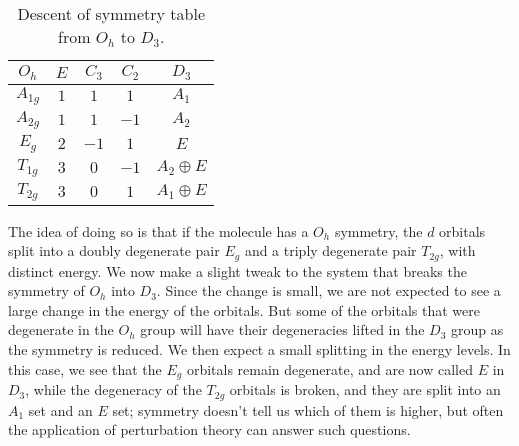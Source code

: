 \documentclass{article}
\theoremstyle{plain}\theoremheaderfont{\normalfont\itshape}\theorembodyfont{\rmfamily}\theoremseparator{.}\newtheorem*{rem}{Remark}\newtheorem*{ex}{Example}\newtheorem*{proof}{Proof}\newtheorem*{altp}{Alternative proof}
\theoremstyle{plain}\theoremheaderfont{\normalfont\bfseries}\theorembodyfont{\rmfamily}\theoremseparator{.}\newtheorem{thm}{Theorem}[section]\newtheorem{lem}[thm]{Lemma}\newtheorem{prop}[thm]{Proposition}\newtheorem*{cor}{Corollary}\newtheorem{defn}[thm]{Definition}\newtheorem{clm}[thm]{Claim}\newtheorem{clminproof}{Claim}\newtheorem*{law}{Law}\newtheorem{pos}[thm]{Postulate}
\theoremstyle{break}\theoremheaderfont{\normalfont\itshape}\theorembodyfont{\rmfamily}\theoremseparator{.\medskip}\newtheorem*{proofskip}{Proof}\newtheorem*{exs}{Examples}\newtheorem*{rems}{Remarks}
\theoremstyle{break}\theoremheaderfont{\normalfont\bfseries}\theorembodyfont{\rmfamily}\theoremseparator{.\medskip}\newtheorem{lemskip}[thm]{Lemma}\newtheorem{defnskip}[thm]{Definition}\newtheorem{propskip}[thm]{Proposition}\newtheorem{thmskip}[thm]{Theorem}
\numberwithin{equation}{section}
\begin{document}
    \begin{table}[ht!]
        \centering
        \begin{tabular}{c|ccc|c}
            \hline
            \(O_h\) & \(E\) & \(C_3\) & \(C_2\) & \(D_3\) \\ \hline
            \(A_{1g}\) & \(1\) & \(1\) & \(1\) &  \(A_1\) \\
            \(A_{2g}\) & \(1\) & \(1\) & \(-1\) &  \(A_2\) \\
            \(E_{g}\) & \(2\) & \(-1\) & \(1\) &  \(E\) \\
            \(T_{1g}\) & \(3\) & \(0\) & \(-1\) &  \(A_2\oplus E\) \\
            \(T_{2g}\) & \(3\) & \(0\) & \(1\) &  \(A_1\oplus E\) \\ \hline
        \end{tabular}
        \caption{Descent of symmetry table from \(O_h\) to \(D_3\).}
    \end{table}

    The idea of doing so is that if the molecule has a \(O_h\) symmetry, the \(d\) orbitals split into a doubly degenerate pair \(E_g\) and a triply degenerate pair \(T_{2g}\), with distinct energy. We now make a slight tweak to the system that breaks the symmetry of \(O_h\) into \(D_3\). Since the change is small, we are not expected to see a large change in the energy of the orbitals. But some of the orbitals that were degenerate in the \(O_h\) group will have their degeneracies lifted in the \(D_3\) group as the symmetry is reduced. We then expect a small splitting in the energy levels. In this case, we see that the \(E_g\) orbitals remain degenerate, and are now called \(E\) in \(D_3\), while the degeneracy of the \(T_{2g}\) orbitals is broken, and they are split into an \(A_1\) set and an \(E\) set; symmetry doesn't tell us which of them is higher, but often the application of perturbation theory can answer such questions.
\end{document}
